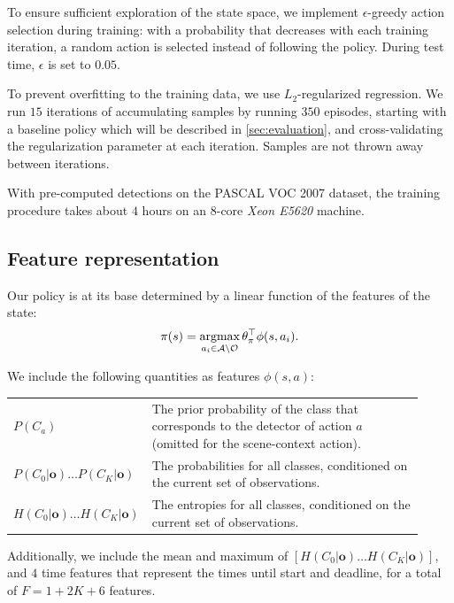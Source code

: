 To ensure sufficient exploration of the state space, we implement $\epsilon$-greedy action selection during training: with a probability that decreases with each training iteration, a random action is selected instead of following the policy.
During test time, $\epsilon$ is set to $0.05$.

To prevent overfitting to the training data, we use $L_2$-regularized regression.
We run $15$ iterations of accumulating samples by running $350$ episodes, starting with a baseline policy which will be described in \autoref{sec:evaluation}, and cross-validating the regularization parameter at each iteration.
Samples are not thrown away between iterations.

With pre-computed detections on the PASCAL VOC 2007 dataset, the training procedure takes about $4$ hours on an $8$-core \emph{Xeon E5620} machine.

\subsection{Feature representation}
Our policy is at its base determined by a linear function of the features of the state:
\begin{align}
\pi(s) = \argmax_{a_i \in \mathcal{A} \setminus \mathcal{O}} \theta_\pi^\top \phi(s,a_i).
\end{align}


We include the following quantities as features $\phi(s,a)$:

\begin{tabularx}{0.8\linewidth}{p{0.23\linewidth}p{0.69\linewidth}}
$P(C_a)$ & The prior probability of the class that corresponds to the detector of action $a$ (omitted for the scene-context action).\\
$P(C_0|\mathbf{o}) \ldots P(C_K|\mathbf{o})$ & The probabilities for all classes, conditioned on the current set of observations.\\
$H(C_0|\mathbf{o}) \ldots H(C_K|\mathbf{o})$ & The entropies for all classes, conditioned on the current set of observations. \\
\end{tabularx}

Additionally, we include the mean and maximum of $[H(C_0|\mathbf{o}) \ldots H(C_K|\mathbf{o})]$, and $4$ time features that represent the times until start and deadline, for a total of $F = 1+2K+6$ features.

